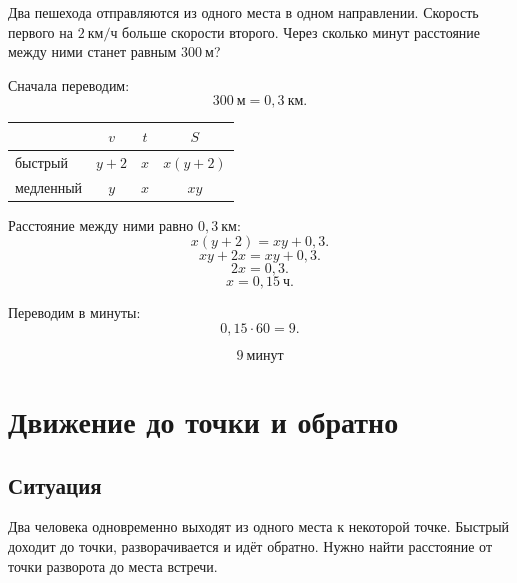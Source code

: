 \documentclass[a4paper,12pt]{article}
\newcommand{\kmh}{\text{км/ч}}
\newcommand{\km}{\text{км}}
\newcommand{\ch}{\text{ч}}
\newcommand{\m}{\text{м}}
\begin{document}
Два пешехода отправляются из одного места в одном направлении. Скорость первого на $2\ \kmh$ больше скорости второго. Через сколько минут расстояние между ними станет равным $300\ \m$?

Сначала переводим:
\[
300\ \m=0{,}3\ \km.
\]

\begin{center}
\renewcommand{\arraystretch}{1.35}
\begin{tabularx}{0.75\linewidth}{X c c c}
\toprule
 & $v$ & $t$ & $S$ \\
\midrule
быстрый & $y+2$ & $x$ & $x(y+2)$ \\
медленный & $y$ & $x$ & $xy$ \\
\bottomrule
\end{tabularx}
\end{center}

Расстояние между ними равно $0{,}3\ \km$:
\[
x(y+2)=xy+0{,}3.
\]
\[
xy+2x=xy+0{,}3.
\]
\[
2x=0{,}3.
\]
\[
x=0{,}15\ \ch.
\]

Переводим в минуты:
\[
0{,}15\cdot 60=9.
\]

\[
\boxed{9\ \text{минут}}
\]

\section{Движение до точки и обратно}

\subsection{Ситуация}

Два человека одновременно выходят из одного места к некоторой точке. Быстрый доходит до точки, разворачивается и идёт обратно. Нужно найти расстояние от точки разворота до места встречи.

\begin{center}
\end{center}
\end{document}
